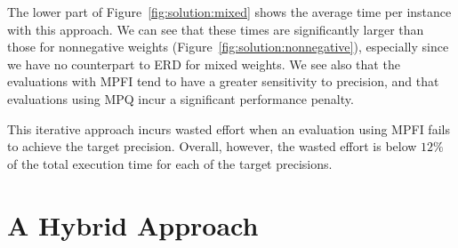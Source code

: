 \documentclass{easychair}
\begin{document}
The lower part of Figure~\ref{fig:solution:mixed} shows the average
time per instance with this approach.  We can see that these times are
significantly larger than those for nonnegative weights (Figure~\ref{fig:solution:nonnegative}), especially
since we have no counterpart to ERD for mixed weights.  We see also
that the evaluations with MPFI tend to have a greater sensitivity to
precision, and that evaluations using MPQ incur a significant performance penalty.

This iterative approach incurs wasted effort when an evaluation using
MPFI fails to achieve the target precision.  Overall,
however, the wasted effort is below $12\%$ of the total execution
time for each of the target precisions.

\section{A Hybrid Approach}
\label{sect:hybrid}

\begin{table}
  \caption{Performance Comparison of Different Implementation
    Strategies for Target Precision $D=30$.  Run entries of the form
    $S$+$F$ indicate that $S$ runs were successful and $F$ runs either
    ran out of memory or failed to meet the target precision.  Our
    hybrid strategy is shown in red.}
  \label{tab:compare}
\end{table}
\end{document}
